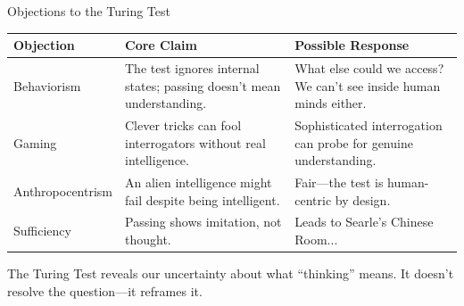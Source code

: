 \documentclass[aspectratio=169,11pt]{beamer}
\begin{document}
\begin{frame}{Objections to the Turing Test}
\begin{table}[h]
\centering
\scriptsize
\begin{tabular}{@{}p{2.5cm}p{4.5cm}p{5cm}@{}}
\toprule
\textbf{Objection} & \textbf{Core Claim} & \textbf{Possible Response} \\
\midrule
Behaviorism & The test ignores internal states; passing doesn't mean understanding. & What else could we access? We can't see inside human minds either. \\
\addlinespace
Gaming & Clever tricks can fool interrogators without real intelligence. & Sophisticated interrogation can probe for genuine understanding. \\
\addlinespace
Anthropocentrism & An alien intelligence might fail despite being intelligent. & Fair---the test is human-centric by design. \\
\addlinespace
Sufficiency & Passing shows imitation, not thought. & Leads to Searle's Chinese Room... \\
\bottomrule
\end{tabular}
\end{table}

\vspace{0.2em}
The Turing Test reveals our uncertainty about what ``thinking'' means. It doesn't resolve the question---it reframes it.
\end{frame}
\end{document}
